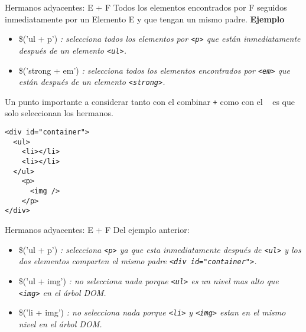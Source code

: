 \begin{frame}[fragile]{Hermanos adyacentes: E + F} %
Todos los elementos encontrados por F seguidos inmediatamente por un Elemento E
y que tengan un mismo padre.
\textbf{Ejemplo}
\begin{itemize}
    \item \$('ul + p') \textit{: selecciona todos los elementos por
    \texttt{<p>} que están inmediatamente después de un elemento \texttt{<ul>}.}
    \item \$('strong + em') \textit{: selecciona todos los elementos
    encontrados por \texttt{<em>} que están después de un elemento
    \texttt{<strong>}.}
\end{itemize}
Un punto importante a considerar tanto con el combinar \texttt{+} como con el
\texttt{~} es que solo seleccionan los hermanos.
\begin{lstlisting}
<div id="container">
  <ul>
    <li></li>
    <li></li>
  </ul>
    <p>
      <img />
    </p>
</div>
\end{lstlisting}
\end{frame}

\begin{frame}[fragile]{Hermanos adyacentes: E + F} %
Del ejemplo anterior:
\begin{itemize}
    \item \$('ul + p') \textit{: selecciona \texttt{<p>} ya que esta
    inmediatamente después de \texttt{<ul>} y los dos elementos comparten el
    mismo padre \texttt{<div id="\/container"\/>}.}
    \item \$('ul + img') \textit{: no selecciona nada porque \texttt{<ul>} es
    un nivel mas alto que \texttt{<img>} en el árbol DOM.}
    \item \$('li + img') \textit{: no selecciona nada porque \texttt{<li>} y
    \texttt{<img>} estan en el mismo nivel en el árbol DOM.}
\end{itemize}
\end{frame}

